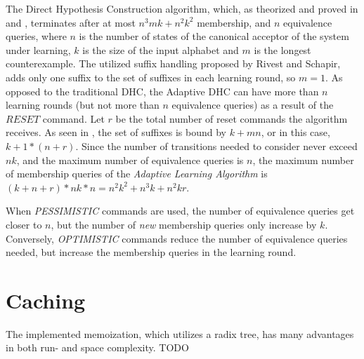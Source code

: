 The Direct Hypothesis Construction algorithm, which, as theorized and proved in \cite{Steffen2011} and \cite{10.1007/978-3-642-34781-8_19}, terminates after at most $n^3mk+n^2k^2$ membership, and $n$ equivalence queries, where $n$ is the number of states of the canonical acceptor of the system under learning, $k$ is the size of the input alphabet and $m$ is the longest counterexample. The utilized suffix handling proposed by Rivest and Schapir\cite{rivest1993inference}, adds only one suffix to the set of suffixes in each learning round, so $m=1$\cite{Steffen2011}. As opposed to the traditional DHC, the Adaptive DHC can have more than $n$ learning rounds (but not more than $n$ equivalence queries) as a result of the $RESET$ command. Let $r$ be the total number of reset commands the algorithm receives. As seen in \cite{Steffen2011}, the set of suffixes is bound by $k+mn$, or in this case, $k+1*(n+r)$. Since the number of transitions needed to consider never exceed $nk$\cite{Steffen2011}, and the maximum number of equivalence queries is $n$, the maximum number of membership queries of the \textit{Adaptive Learning Algorithm} is $(k+n+r)*nk*n = $\textbf{$ n^2k^2+n^3k+n^2kr$}.

When \textit{PESSIMISTIC} commands are used, the number of equivalence queries get closer to $n$, but the number of \textit{new} membership queries only increase by $k$. Conversely, \textit{OPTIMISTIC} commands reduce the number of equivalence queries needed, but increase the membership queries in the learning round.
\section{Caching} \label{subs_evalcaching}

The implemented memoization, which utilizes a radix tree, has many advantages in both run- and space complexity. TODO